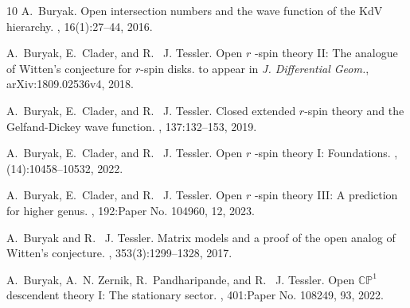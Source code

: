 \documentclass[11pt]{amsart}
\theoremstyle{definition}
\theoremstyle{remark}
\newcommand{\<}{\left<}
\renewcommand{\>}{\right>}
\numberwithin{equation}{section}
\begin{document}
\begin{thebibliography}{10}
A.~Buryak.
\newblock Open intersection %
numbers and the wave function of the {K}d{V}
  hierarchy.
, 16(1):27--44, 2016.

A.~Buryak, E.~Clader, and R.~%
J. Tessler.
\newblock Open $r$%
-spin theory {I}{I}: {T}he analogue of {W}itten's conjecture
  for $r$-spin disks.
\newblock to appear in \textit{J. Differential Geom.}, arXiv:1809.02536v4,
  2018.

A.~Buryak, E.~Clader, and R.~%
J. Tessler.
\newblock Closed extended %
{$r$}-spin theory and the {G}elfand-{D}ickey wave
  function.
, 137:132--153, 2019.

A.~Buryak, E.~Clader, and R.~%
J. Tessler.
\newblock Open {$r$%
}-spin theory {I}: {F}oundations.
, (14):10458--10532, 2022.

A.~Buryak, E.~Clader, and R.~%
J. Tessler.
\newblock Open {$r$%
}-spin theory {III}: {A} prediction for higher genus.
, 192:Paper No. 104960, 12, 2023.

A.~Buryak and R.~%
J. Tessler.
\newblock Matrix models %
and a proof of the open analog of {W}itten's
  conjecture.
, 353(3):1299--1328, 2017.

A.~Buryak, A.~N. Zernik, R.~Pandharipande, and R.~%
J. Tessler.
\newblock Open {$\mathbb{CP}^1$%
} descendent theory {I}: {T}he stationary
  sector.
, 401:Paper No. 108249, 93, 2022.


\end{thebibliography}
\end{document}
